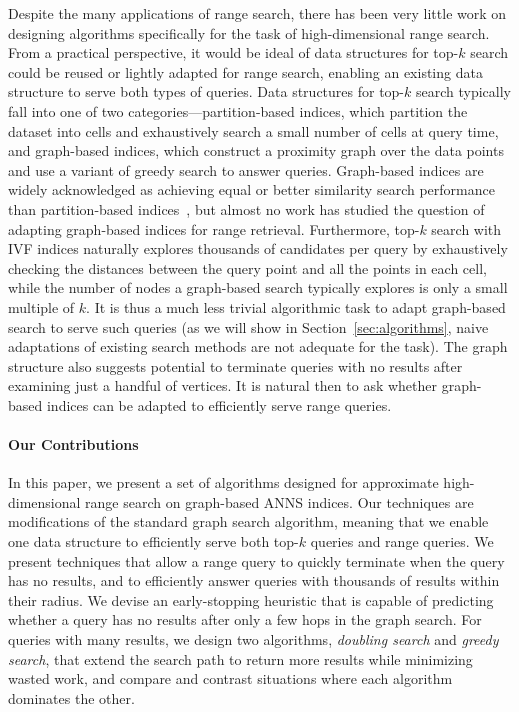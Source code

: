 Despite the many applications of range search, there has been very little work on designing algorithms specifically for the task of high-dimensional range search. From a practical perspective, it would be ideal of data structures for top-$k$ search could be reused or lightly adapted for range search, enabling an existing data structure to serve both types of queries. Data structures for top-$k$ search typically fall into one of two categories---partition-based indices, which partition the dataset into cells and exhaustively search a small number of cells at query time, and graph-based indices, which construct a proximity graph over the data points and use a variant of greedy search to answer queries. Graph-based indices are widely acknowledged as achieving equal or better similarity search performance than partition-based indices~\cite{wang2021comprehensive}, but almost no work has studied the question of adapting graph-based indices for range retrieval. Furthermore, top-$k$ search with IVF indices naturally explores thousands of candidates per query by exhaustively checking the distances between the query point and all the points in each cell, while the number of nodes a graph-based search typically explores is only a small multiple of $k$. It is thus a much less trivial algorithmic task to adapt graph-based search to serve such queries (as we will show in Section~\ref{sec:algorithms}, naive adaptations of existing search methods are not adequate for the task). The graph structure also suggests potential to terminate queries with no results after examining just a handful of vertices. It is natural then to ask whether graph-based indices can be adapted to efficiently serve range queries. 

\paragraph{Our Contributions} In this paper, we present a set of algorithms designed for approximate high-dimensional range search on graph-based ANNS indices. Our techniques are modifications of the standard graph search algorithm, meaning that we enable one data structure to efficiently serve both top-$k$ queries and range queries. We present techniques that allow a range query to quickly terminate when the query has no results, and to efficiently answer queries with thousands of results within their radius. We devise an early-stopping heuristic that is capable of predicting whether a query has no results after only a few hops in the graph search. For queries with many results, we design two algorithms, \textit{doubling search} and \textit{greedy search}, that extend the search path to return more results while minimizing wasted work, and compare and contrast situations where each algorithm dominates the other.

